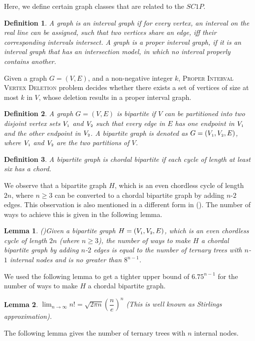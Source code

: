 \documentclass[review, 1p]{elsarticle}
\newtheorem{lemma}{Lemma}
\newtheorem{definition}{Definition}
\begin{document}
\noindent Here, we define certain graph classes that are related to the $SC1P$.
\begin{definition} \textup{A graph is an \textit{interval graph} if for every vertex, an interval on the real line can be assigned, such that two vertices share an edge, iff their corresponding intervals intersect. A graph is a \textit{proper interval} graph, if it is an interval graph that has an intersection model, in which no interval properly contains another.}\end{definition} \noindent Given a graph $G=(V,E)$, and a non-negative integer $k$, \textsc{Proper Interval Vertex Deletion} \cite{van2013proper} problem \label{proper} decides whether there exists a set of vertices of size at most $k$ in $V$, whose deletion results in a proper interval graph. 
\begin{definition}\textup{A graph $G = (V, E)$ is \textit{bipartite} if $V$ can be partitioned into two disjoint vertex sets $V_{\mathsmaller{1}}$ and $V_{\mathsmaller{2}}$ such that every edge in $E$ has one endpoint in $V_{\mathsmaller{1}}$ and the other endpoint in $V_{\mathsmaller{2}}$. A bipartite graph is denoted as $G=(V_{\mathsmaller{1}},V_{\mathsmaller{2}},E)$, where $V_{\mathsmaller{1}}$ and $V_{\mathsmaller{2}}$  are the two partitions of $V$.}\end{definition} \begin{definition}\textup{A bipartite graph is \textit{chordal bipartite} if each cycle of length at least six has a chord.}\end{definition}\noindent We observe that a bipartite graph $H$, which is an even chordless cycle of length $2n$, where $n \geq 3$ can be converted to a chordal bipartite graph by adding $n$-$2$ edges. This observation is also mentioned in a different form in \textup{(\cite[Lemma 4.2]{kaplan1999tractability})}. The number of ways to achieve this is given in the following lemma.
\begin{lemma}\textup{(\cite[Lemma 4.3]{kaplan1999tractability})}\label{main1}
Given a bipartite graph $H=(V_{\mathsmaller{1}}, V_{\mathsmaller{2}}, E)$, which is an even chordless cycle of length $2n$ (where $n \geq 3$), the number of ways to make $H$ a chordal bipartite graph  by adding $n$-$2$ edges is equal to the number of ternary trees with $n$-$1$ internal nodes and is no greater than $8^{n-1}$.
\end{lemma}
We used the following lemma to get a tighter upper bound of $6.75^{n-1}$ for the number of ways to make $H$ a chordal bipartite graph.
\begin{lemma} \textup{\cite{stirling}}\label{main2} 
$\lim_{n\to\infty} n! = {\sqrt{2\pi{n}}{(\dfrac{n}{e})}^{n}}$ (This is well known as Stirlings approximation). 
\end{lemma} The following lemma gives the number of ternary trees with $n$ internal nodes.
\end{document}
